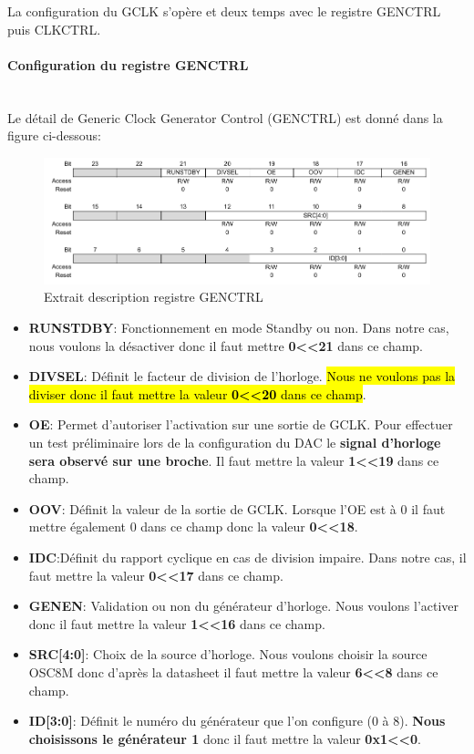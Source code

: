 \documentclass[a4paper]{article}
\begin{document}
La configuration du GCLK s'opère et deux temps avec le registre GENCTRL puis CLKCTRL.

\paragraph{Configuration du registre GENCTRL} 
~~\\
Le détail de Generic Clock Generator Control (GENCTRL) est donné dans la figure ci-dessous:
\begin{figure}[H]
	\centering
	\includegraphics[width=13cm]{extr_GENCTRL}
	\caption{Extrait description registre GENCTRL}
\end{figure}
\newpage
\begin{itemize}
	\item {\bf RUNSTDBY}: Fonctionnement en mode Standby ou non. Dans notre cas, nous voulons la désactiver donc il faut mettre {\bf 0\textless\textless21} dans ce champ.~~\\
	\item {\bf DIVSEL}: Définit le facteur de division de l’horloge. \hl{Nous ne voulons pas la diviser donc il faut mettre la valeur {\bf 0\textless\textless20} dans ce champ}.~~\\
	\item {\bf OE}: Permet d’autoriser l’activation sur une sortie de GCLK. Pour effectuer un test préliminaire lors de la configuration du DAC le \textbf{signal d'horloge sera observé sur une broche}. Il faut mettre la valeur {\bf 1\textless\textless19} dans ce champ.~~\\
	\item {\bf OOV}: Définit la valeur de la sortie de GCLK. Lorsque l’OE est à 0 il faut mettre également 0 dans ce champ donc la valeur {\bf 0\textless\textless18}.~~\\
	\item {\bf IDC}:Définit du rapport cyclique en cas de division impaire. Dans notre cas, il faut mettre la valeur {\bf 0\textless\textless17} dans ce champ.~~\\
	\item {\bf GENEN}: Validation ou non du générateur d’horloge. Nous voulons l’activer donc il faut mettre la valeur {\bf 1\textless\textless16} dans ce champ.~~\\
	\item {\bf SRC[4:0]}: Choix de la source d’horloge. Nous voulons choisir la source OSC8M donc d’après la datasheet il faut mettre la valeur {\bf 6\textless\textless8} dans ce champ. ~~\\
	\item {\bf ID[3:0]}: Définit le numéro du générateur que l'on configure (0 à 8). \textbf{Nous choisissons le générateur 1} donc il faut mettre la valeur {\bf 0x1\textless\textless0}.
\end{itemize}
\end{document}
